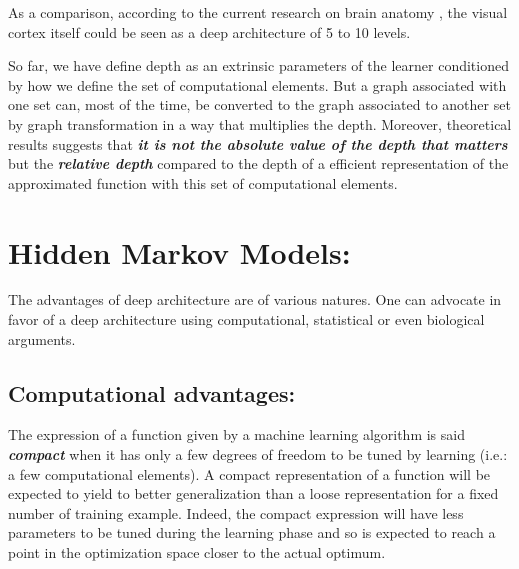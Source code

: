 \documentclass[a4paper,11pt]{report}
\newcommand{\Important}[1]{\textbf{{\em #1}}}
\begin{document}
		As a comparison, according to the current research on brain anatomy \cite{Serre_2007}, the visual cortex itself could be seen as a deep architecture of 5 to 10 levels.\\\par
        
		So far, we have define depth as an extrinsic parameters of the learner conditioned by how we define the set of computational elements. But a graph associated with one set can, most of the time, be converted to the graph associated to another set by graph transformation in a way that multiplies the depth. Moreover, theoretical results suggests that \Important{it is not the absolute value of the depth that matters} but the \Important{relative depth} compared to the depth of a efficient representation of the approximated function with this set of computational elements.
     
     
	\section{Hidden Markov Models:}
		\label{seq:Deep neural networks/Advantages of a deep architecture}  
		The advantages of deep architecture are of various natures. One can advocate in favor of a deep architecture using computational, statistical or even biological arguments.
            
		\subsection{Computational advantages:}
			\label{subseq:Deep neural networks/Advantages of a deep architecture/Computational advantages}      
			The expression of a function given by a machine learning algorithm is said \Important{compact} when it has only a few degrees of freedom to be  tuned by learning (i.e.: a few computational elements). A compact representation of a function will be expected to yield to better generalization than a loose representation for a fixed number of training example. Indeed, the compact expression will have less parameters to be tuned during the learning phase and so is expected to reach a point in the optimization space closer to the actual optimum. \\\par
    
\end{document}
